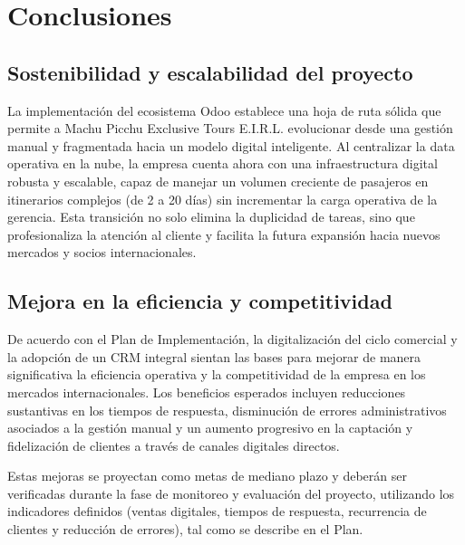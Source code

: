 \section{Conclusiones}

\subsection{Sostenibilidad y escalabilidad del proyecto}

\begin{indentedsubsection}
La implementación del ecosistema Odoo establece una hoja de ruta sólida que permite a Machu Picchu Exclusive Tours E.I.R.L. evolucionar desde una gestión manual y fragmentada hacia un modelo digital inteligente. Al centralizar la data operativa en la nube, la empresa cuenta ahora con una infraestructura digital robusta y escalable, capaz de manejar un volumen creciente de pasajeros en itinerarios complejos (de 2 a 20 días) sin incrementar la carga operativa de la gerencia. Esta transición no solo elimina la duplicidad de tareas, sino que profesionaliza la atención al cliente y facilita la futura expansión hacia nuevos mercados y socios internacionales.

\end{indentedsubsection}

\subsection{Mejora en la eficiencia y competitividad}

\begin{indentedsubsection}
De acuerdo con el Plan de Implementación, la digitalización del ciclo comercial y la adopción de un CRM integral sientan las bases para mejorar de manera significativa la eficiencia operativa y la competitividad de la empresa en los mercados internacionales. Los beneficios esperados incluyen reducciones sustantivas en los tiempos de respuesta, disminución de errores administrativos asociados a la gestión manual y un aumento progresivo en la captación y fidelización de clientes a través de canales digitales directos.

Estas mejoras se proyectan como metas de mediano plazo y deberán ser verificadas durante la fase de monitoreo y evaluación del proyecto, utilizando los indicadores definidos (ventas digitales, tiempos de respuesta, recurrencia de clientes y reducción de errores), tal como se describe en el Plan.

\end{indentedsubsection}


